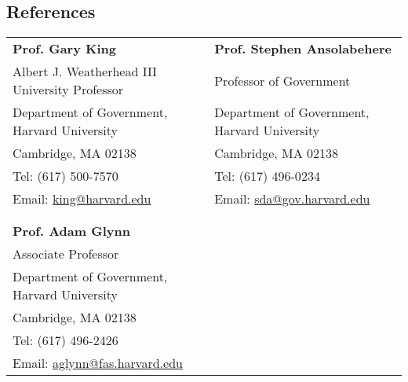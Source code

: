 \documentclass[margin,line]{res}
\begin{document}
\begin{resume}
\section{\sc References}
\begin{tabular}{ll}
\textbf{Prof. Gary King} & \textbf{Prof. Stephen Ansolabehere} \\ 
Albert J. Weatherhead III University Professor & Professor of Government\\
Department of Government, Harvard University & Department of Government, Harvard University \\ 
Cambridge, MA 02138 & Cambridge, MA 02138 \\ 
Tel: (617) 500-7570 & Tel: (617) 496-0234\\
Email: \href{mailto:king@harvard.edu}{king@harvard.edu} & Email: \href{mailto:sda@gov.harvard.edu}{sda@gov.harvard.edu} \\ 
& \\
& \\
\textbf{Prof. Adam Glynn} & \\ 
Associate Professor &\\
Department of Government, Harvard University & \\ 
Cambridge, MA 02138 & \\ 
Tel: (617) 496-2426 &\\
Email: \href{mailto:aglynn@fas.harvard.edu}{aglynn@fas.harvard.edu}  & 
\end{tabular}

\end{resume}
\end{document}
